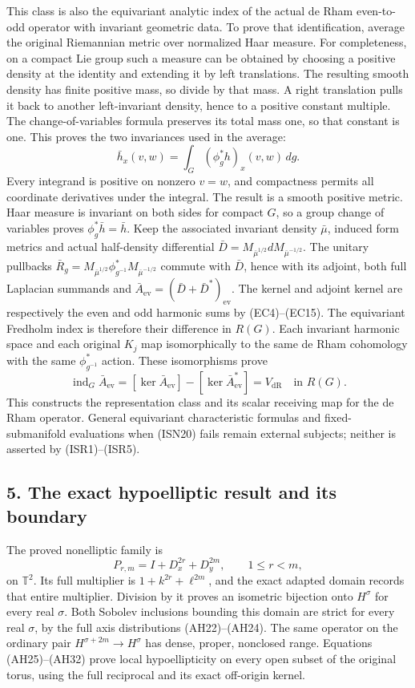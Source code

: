 \documentclass[
  11pt,
]{article}
\newcounter{none} %
\begin{document}
This class is also the equivariant analytic index of the actual de Rham
even-to-odd operator with invariant geometric data. To prove that
identification, average the original Riemannian metric over normalized
Haar measure. For completeness, on a compact Lie group such a measure
can be obtained by choosing a positive density at the identity and
extending it by left translations. The resulting smooth density has
finite positive mass, so divide by that mass. A right translation pulls
it back to another left-invariant density, hence to a positive constant
multiple. The change-of-variables formula preserves its total mass one,
so that constant is one. This proves the two invariances used in the
average: \[
 \bar h_x(v,w)
   =\int_G(\phi_g^*h)_x(v,w)\,dg .
 \tag{ISR4}
\] Every integrand is positive on nonzero \(v=w\), and compactness
permits all coordinate derivatives under the integral. The result is a
smooth positive metric. Haar measure is invariant on both sides for
compact \(G\), so a group change of variables proves
\(\phi_g^*\bar h=\bar h\). Keep the associated invariant density
\(\bar\mu\), induced form metrics and actual half-density differential
\(\bar D=M_{\bar\mu^{1/2}}dM_{\bar\mu^{-1/2}}\). The unitary pullbacks
\(\bar R_g=M_{\bar\mu^{1/2}}\phi_{g^{-1}}^*
M_{\bar\mu^{-1/2}}\) commute with \(\bar D\), hence with its adjoint,
both full Laplacian summands and
\(\bar A_{\mathrm{ev}}=(\bar D+\bar D^*)_{\mathrm{ev}}\). The kernel and
adjoint kernel are respectively the even and odd harmonic sums by
(EC4)--(EC15). The equivariant Fredholm index is therefore their
difference in \(R(G)\). Each invariant harmonic space and each original
\(K_j\) map isomorphically to the same de Rham cohomology with the same
\(\phi_{g^{-1}}^*\) action. These isomorphisms prove \[
 \operatorname{ind}_G\bar A_{\mathrm{ev}}
 =[\ker\bar A_{\mathrm{ev}}]-[\ker\bar A_{\mathrm{ev}}^*]
 =V_{\mathrm{dR}}\quad\text{in }R(G).
 \tag{ISR5}
\] This constructs the representation class and its scalar receiving map
for the de Rham operator. General equivariant characteristic formulas
and fixed-submanifold evaluations when (ISN20) fails remain external
subjects; neither is asserted by (ISR1)--(ISR5).

\subsection{5. The exact hypoelliptic result and its
boundary}\label{the-exact-hypoelliptic-result-and-its-boundary}

The proved nonelliptic family is \[
 P_{r,m}=I+D_x^{2r}+D_y^{2m},
 \qquad
 1\leq r<m,
 \tag{ISN24}
\] on \(\mathbb T^2\). Its full multiplier is \(1+k^{2r}+\ell^{2m}\),
and the exact adapted domain records that entire multiplier. Division by
it proves an isometric bijection onto \(H^\sigma\) for every real
\(\sigma\). Both Sobolev inclusions bounding this domain are strict for
every real \(\sigma\), by the full axis distributions (AH22)--(AH24).
The same operator on the ordinary pair \(H^{\sigma+2m}\to H^\sigma\) has
dense, proper, nonclosed range. Equations (AH25)--(AH32) prove local
hypoellipticity on every open subset of the original torus, using the
full reciprocal and its exact off-origin kernel.
\end{document}
